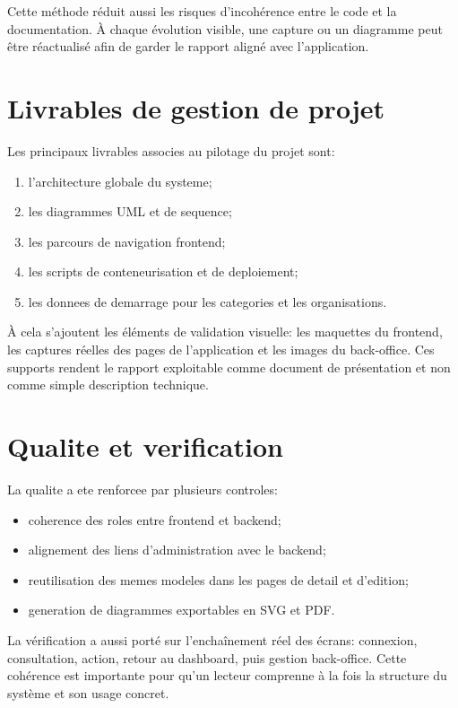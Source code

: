 \documentclass[12pt,a4paper]{report}
\begin{document}
Cette méthode réduit aussi les risques d'incohérence entre le code et la documentation. À chaque évolution visible, une capture ou un diagramme peut être réactualisé afin de garder le rapport aligné avec l'application.

\section{Livrables de gestion de projet}
Les principaux livrables associes au pilotage du projet sont:
\begin{enumerate}[leftmargin=1.2cm]
  \item l'architecture globale du systeme;
  \item les diagrammes UML et de sequence;
  \item les parcours de navigation frontend;
  \item les scripts de conteneurisation et de deploiement;
  \item les donnees de demarrage pour les categories et les organisations.
\end{enumerate}

À cela s'ajoutent les éléments de validation visuelle: les maquettes du frontend, les captures réelles des pages de l'application et les images du back-office. Ces supports rendent le rapport exploitable comme document de présentation et non comme simple description technique.

\section{Qualite et verification}
La qualite a ete renforcee par plusieurs controles:
\begin{itemize}[leftmargin=1.2cm]
  \item coherence des roles entre frontend et backend;
  \item alignement des liens d'administration avec le backend;
  \item reutilisation des memes modeles dans les pages de detail et d'edition;
  \item generation de diagrammes exportables en SVG et PDF.
\end{itemize}

La vérification a aussi porté sur l'enchaînement réel des écrans: connexion, consultation, action, retour au dashboard, puis gestion back-office. Cette cohérence est importante pour qu'un lecteur comprenne à la fois la structure du système et son usage concret.
\end{document}
